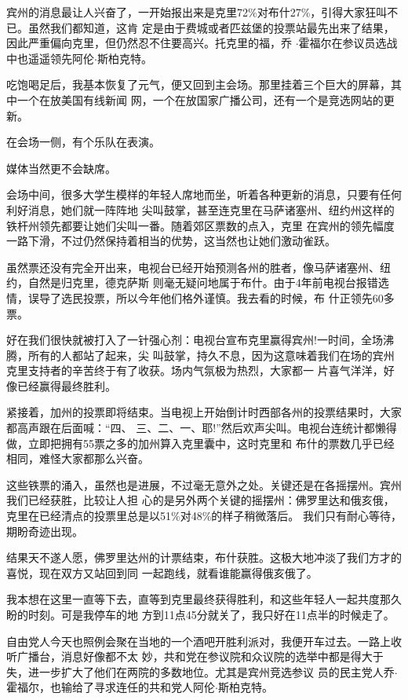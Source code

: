 ﻿\documentclass[11pt]{article}
\begin{document}
宾州的消息最让人兴奋了，一开始报出来是克里72\%对布什27\%，引得大家狂叫不已。虽然我们都知道，这肯
定是由于费城或者匹兹堡的投票站最先出来了结果，因此严重偏向克里，但仍然忍不住要高兴。托克里的福，乔
$\cdot$霍福尔在参议员选战中也遥遥领先阿伦$\cdot$斯柏克特。

吃饱喝足后，我基本恢复了元气，便又回到主会场。那里挂着三个巨大的屏幕，其中一个在放美国有线新闻
网，一个在放国家广播公司，还有一个是竞选网站的更新。


在会场一侧，有个乐队在表演。

媒体当然更不会缺席。

会场中间，很多大学生模样的年轻人席地而坐，听着各种更新的消息，只要有任何利好消息，她们就一阵阵地
尖叫鼓掌，甚至连克里在马萨诸塞州、纽约州这样的铁杆州领先都要让她们尖叫一番。随着郊区票数的点入，克里
在宾州的领先幅度一路下滑，不过仍然保持着相当的优势，这当然也让她们激动雀跃。

虽然票还没有完全开出来，电视台已经开始预测各州的胜者，像马萨诸塞州、纽约，自然是归克里，德克萨斯
则毫无疑问地属于布什。由于4年前电视台报错选情，误导了选民投票，所以今年他们格外谨慎。我去看的时候，布
什正领先60多票。

好在我们很快就被打入了一针强心剂：电视台宣布克里赢得宾州!一时间，全场沸腾，所有的人都站了起来，尖
叫鼓掌，持久不息，因为这意味着我们在场的宾州克里支持者的辛苦终于有了收获。场内气氛极为热烈，大家都一
片喜气洋洋，好像已经赢得最终胜利。

紧接着，加州的投票即将结束。当电视上开始倒计时西部各州的投票结果时，大家都高声跟在后面喊：``四、
三、二、一、耶!''然后欢声尖叫。电视台连统计都懒得做，立即把拥有55票之多的加州算入克里囊中，这时克里和
布什的票数几乎已经相同，难怪大家都那么兴奋。

这些铁票的涌入，虽然也是进展，不过毫无意外之处。关键还是在各摇摆州。宾州我们已经获胜，比较让人担
心的是另外两个关键的摇摆州：佛罗里达和俄亥俄，克里在已经清点的投票里总是以51\%对48\%的样子稍微落后。
我们只有耐心等待，期盼奇迹出现。

结果天不遂人愿，佛罗里达州的计票结束，布什获胜。这极大地冲淡了我们方才的喜悦，现在双方又站回到同
一起跑线，就看谁能赢得俄亥俄了。

我本想在这里一直等下去，直等到克里最终获得胜利，和这些年轻人一起共度那久盼的时刻。可是我停车的地
方到11点45分就关了，我只好在11点半的时候走了。

自由党人今天也照例会聚在当地的一个酒吧开胜利派对，我便开车过去。一路上收听广播台，消息好像都不太
妙，共和党在参议院和众议院的选举中都是得大于失，进一步扩大了他们在两院的多数地位。尤其是宾州竞选参议
员的民主党人乔$\cdot$霍福尔，也输给了寻求连任的共和党人阿伦$\cdot$斯柏克特。
\end{document}
